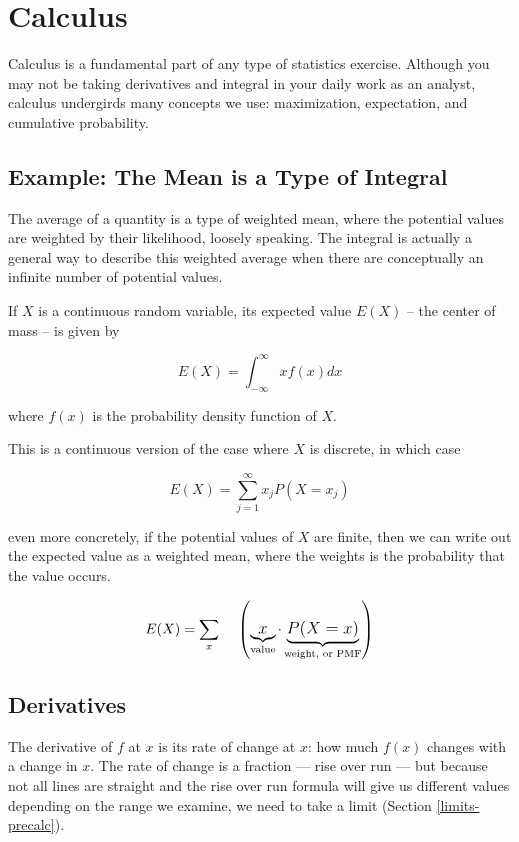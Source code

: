 \documentclass[]{book}
\theoremstyle{definition}
\theoremstyle{definition}
\theoremstyle{definition}
\theoremstyle{remark}
\begin{document}
\hypertarget{derivatives}{%
\chapter{Calculus}\label{derivatives}}

Calculus is a fundamental part of any type of statistics exercise. Although you may not be taking derivatives and integral in your daily work as an analyst, calculus undergirds many concepts we use: maximization, expectation, and cumulative probability.

\hypertarget{example-the-mean-is-a-type-of-integral}{%
\section*{Example: The Mean is a Type of Integral}\label{example-the-mean-is-a-type-of-integral}}

The average of a quantity is a type of weighted mean, where the potential values are weighted by their likelihood, loosely speaking. The integral is actually a general way to describe this weighted average when there are conceptually an infinite number of potential values.

If \(X\) is a continuous random variable, its expected value \(E(X)\) -- the center of mass -- is given by

\[E(X) = \int^{\infty}_{-\infty}x f(x) dx\]

where \(f(x)\) is the probability density function of \(X\).

This is a continuous version of the case where \(X\) is discrete, in which case

\[E(X) = \sum^\infty_{j=1} x_j P(X = x_j)\]

even more concretely, if the potential values of \(X\) are finite, then we can write out the expected value as a weighted mean, where the weights is the probability that the value occurs.

\[E(X) = \large \sum_{x} \quad\left( \underbrace{x}_{\text{value}}\cdot \underbrace{P(X = x)}_{\text{weight, or PMF}}\right)\]

\hypertarget{derivintro}{%
\section{Derivatives}\label{derivintro}}

The derivative of \(f\) at \(x\) is its rate of change at \(x\): how much \(f(x)\) changes with a change in \(x\). The rate of change is a fraction --- rise over run --- but because not all lines are straight and the rise over run formula will give us different values depending on the range we examine, we need to take a limit (Section \ref{limits-precalc}).
\end{document}
